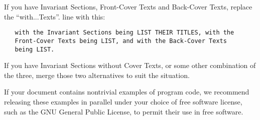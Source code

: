 If you have Invariant Sections, Front-Cover Texts and Back-Cover
Texts, replace the ``with...Texts''. line with this:

\begin{verbatim}
   with the Invariant Sections being LIST THEIR TITLES, with the
   Front-Cover Texts being LIST, and with the Back-Cover Texts
   being LIST.
\end{verbatim}

If you have Invariant Sections without Cover Texts, or some other
combination of the three, merge those two alternatives to suit the
situation.

If your document contains nontrivial examples of program code, we
recommend releasing these examples in parallel under your choice of
free software license, such as the GNU General Public License, to
permit their use in free software.

